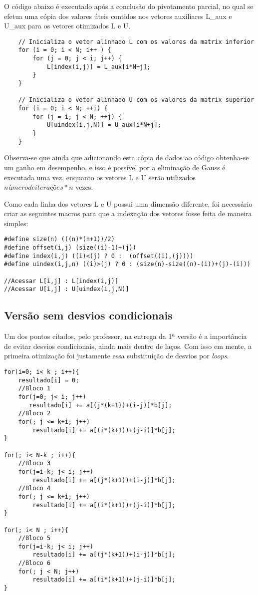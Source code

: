 \documentclass[12pt]{article}
\begin{document}
O código abaixo é executado após a conclusão do pivotamento parcial, no qual se efetua uma cópia dos valores úteis contidos nos vetores auxiliares L\_aux e U\_aux para os vetores otimizados L e U.

\begin{lstlisting}
    // Inicializa o vetor alinhado L com os valores da matrix inferior
    for (i = 0; i < N; i++ ) {
        for (j = 0; j < i; j++) {
            L[index(i,j)] = L_aux[i*N+j];
        }
    }

    // Inicializa o vetor alinhado U com os valores da matrix superior
    for (i = 0; i < N; ++i) {
        for (j = i; j < N; ++j) {
            U[uindex(i,j,N)] = U_aux[i*N+j];
        }
    }
\end{lstlisting}

Observa-se que ainda que adicionando esta cópia de dados ao código obtenha-se um ganho em desempenho, e isso é possível por a eliminação de Gauss é executada uma vez, enquanto os vetores L e U serão utilizados $número de iterações * n$ vezes.

Como cada linha dos vetores L e U possui uma dimensão diferente, foi necessário criar as seguintes macros para que a indexação dos vetores fosse feita de maneira simples:

\begin{lstlisting}
#define size(n) (((n)*(n+1))/2)
#define offset(i,j) (size((i)-1)+(j))
#define index(i,j) ((i)<(j) ? 0 :  (offset((i),(j))))
#define uindex(i,j,n) ((i)>(j) ? 0 : (size(n)-size((n)-(i))+(j)-(i)))

//Acessar L[i,j] : L[index(i,j)]
//Acessar U[i,j] : U[uindex(i,j,N)]
\end{lstlisting}



\subsection{Versão sem desvios condicionais}
Um dos pontos citados, pelo professor, na entrega da 1ª versão é a importância de evitar desvios condicionais, ainda mais dentro de laços. Com isso em mente, a primeira otimização foi justamente essa substituição de desvios por \textit{loops}.
\begin{lstlisting}
for(i=0; i< k ; i++){
    resultado[i] = 0;
    //Bloco 1
    for(j=0; j< i; j++)
       resultado[i] += a[(j*(k+1))+(i-j)]*b[j];
    //Bloco 2
    for(; j <= k+i; j++)
        resultado[i] += a[(i*(k+1))+(j-i)]*b[j];
}

for(; i< N-k ; i++){
    //Bloco 3
    for(j=i-k; j< i; j++)
        resultado[i] += a[(j*(k+1))+(i-j)]*b[j];
    //Bloco 4
    for(; j <= k+i; j++)
        resultado[i] += a[(i*(k+1))+(j-i)]*b[j];
}

for(; i< N ; i++){
    //Bloco 5
    for(j=i-k; j< i; j++)
        resultado[i] += a[(j*(k+1))+(i-j)]*b[j];
    //Bloco 6
    for(; j < N; j++)
        resultado[i] += a[(i*(k+1))+(j-i)]*b[j];
}
\end{lstlisting}
\end{document}
